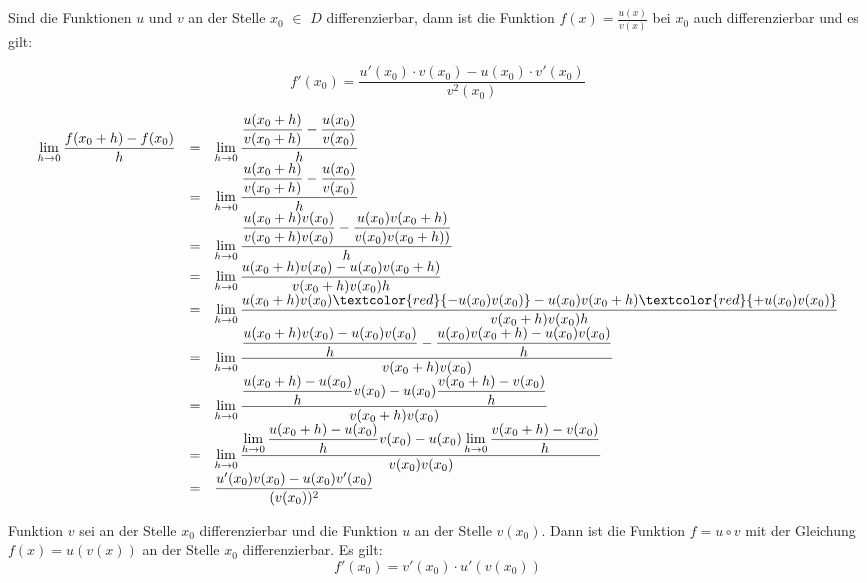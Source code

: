 \documentclass[main.tex]{subfiles}
\begin{document}
\begin{Theorem}[Quotientenregel]
	Sind die Funktionen $u$ und $v$ an der Stelle $x_{0}$ $\in$ $D$ differenzierbar, dann ist die Funktion $f(x)=\frac{u(x)} {v(x)}$ bei $x_{0}$ auch differenzierbar und es gilt:

	$$f'(x_{0})=\frac{u'(x_{0})\cdot v(x_{0})-u(x_{0})\cdot v'(x_{0})}{v^2(x_{0})}$$
\end{Theorem}

\begin{Beweis}
	$$\begin{array}{rcl}
		\lim\limits_{h \rightarrow 0} {\dfrac{f(x_{0}+h)-f(x_{0})}{h}}&=& \lim\limits_{h \rightarrow 0} { \dfrac{ \dfrac{u(x_{0}+h)} {v(x_{0}+h)}- \dfrac{u(x_{0})}  {v(x_{0})}}  {h}}\\
		&=&\lim\limits_{h \rightarrow 0} {\dfrac{\dfrac {u(x_{0}+h)}{v(x_{0}+h)}-\dfrac {u(x_{0})} {v(x_{0})}}   {h}}\\
		&=&\lim\limits_{h \rightarrow 0} {\dfrac {\dfrac{  u(x_{0}+h)v(x_{0})}{v(x_{0}+h)v(x_{0})}   -\dfrac{u(x_{0})v(x_{0}+h)}{v(x_{0})v(x_{0}+h))}} {h}}\\
		&=&\lim\limits_{h \rightarrow 0} {\dfrac     {u(x_{0}+h)v(x_{0})-u(x_{0})v(x_{0}+h)}    {v(x_{0}+h)v(x_{0})h }}\\
		&=&\lim\limits_{h \rightarrow 0} {\dfrac {u(x_{0}+h)v(x_{0}) \textcolor{red}{-u(x_{0})v(x_{0})} -u(x_{0})v(x_{0}+h) \textcolor{red}{+u(x_{0})v(x_{0})}}  {v(x_{0}+h)v(x_{0})h}   }\\
		&=&\lim\limits_{h \rightarrow 0} {\dfrac   {\dfrac{u(x_{0}+h)v(x_{0})-u(x_{0})v(x_{0})}{h}  -   \dfrac{u(x_{0})v(x_{0}+h)-u(x_{0})v(x_{0})} {h} }    {v(x_{0}+h)v(x_{0})}}\\
		&=&\lim\limits_{h \rightarrow 0} { \dfrac     {\dfrac{u(x_{0}+h)-u(x_{0})}{h} v(x_{0})  -   u(x_{0}) \dfrac   {v(x_{0}+h)-v(x_{0})}  {h}  }         {v(x_{0}+h)v(x_{0})}     }\\
		&=&\lim\limits_{h \rightarrow 0} { \dfrac  {\lim\limits_{h \rightarrow 0} {\dfrac{u(x_{0}+h)-u(x_{0})}{h}   }v(x_{0})  - u(x_{0}) \lim\limits_{h \rightarrow 0} { \dfrac{ v(x_{0}+h)-v(x_{0})}{h}   }  }      {v(x_{0})v(x_{0})}}    \\
		&=& { \dfrac{u'(x_{0})v(x_{0})-u(x_{0})v'(x_{0})} {(v(x_{0}))^2}}
	\end{array}$$
\end{Beweis}

\begin{Theorem}[Kettenregel]
	 Funktion $v$ sei an der Stelle $x_{0}$ differenzierbar und die Funktion $u$ an der Stelle $v(x_{0})$. Dann ist die Funktion $f=u\circ v$ mit der Gleichung $f(x)= u(v(x))$ an der Stelle $x_{0}$ differenzierbar. Es gilt:
	$$f'(x_{0})=v'(x_{0})\cdot u'(v(x_{0}))$$
\end{Theorem}
\end{document}
